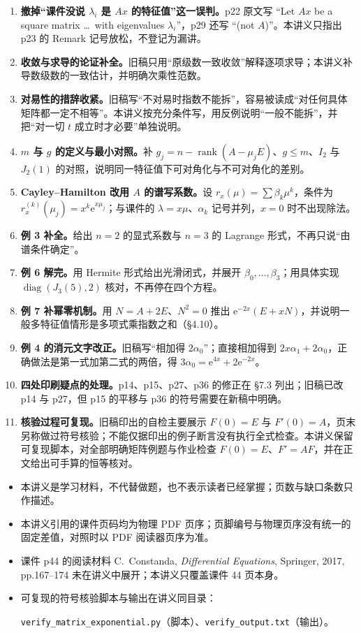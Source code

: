 \documentclass[11pt]{ctexart}
\let\basesubhdr\subhdr
\renewcommand{\subhdr}[1]{\needspace{8\baselineskip}\basesubhdr{#1}}
\DeclareMathOperator{\rank}{rank}
\DeclareMathOperator{\diag}{diag}
\newcommand{\ee}{\mathrm{e}}
\begin{document}
\begin{enumerate}
  \item \textbf{撤掉“课件没说 $\lambda_i$ 是 $Ax$ 的特征值”这一误判。}p22 原文写 “Let $Ax$ be a square matrix \dots\ with eigenvalues $\lambda_i$”，p29 还写 “(not $A$)”。本讲义只指出 p23 的 Remark 记号放松，不登记为漏讲。
  \item \textbf{收敛与求导的论证补全。}旧稿只用“原级数一致收敛”解释逐项求导；本讲义补导数级数的一致估计，并明确次乘性范数。
  \item \textbf{对易性的措辞收紧。}旧稿写“不对易时指数不能拆”，容易被读成“对任何具体矩阵都一定不相等”。本讲义按充分条件写，用反例说明“一般不能拆”，并把“对一切 $t$ 成立时才必要”单独说明。
  \item \textbf{$m$ 与 $g$ 的定义与最小对照。}补 $g_j=n-\rank(A-\mu_jE)$、$g\le m$、$I_2$ 与 $J_2(1)$ 的对照，说明同一特征值下可对角化与不可对角化的差别。
  \item \textbf{Cayley--Hamilton 改用 $A$ 的谱写系数。}设 $r_x(\mu)=\sum\beta_k\mu^k$，条件为 $r_x^{(k)}(\mu_j)=x^k\ee^{x\mu_j}$；与课件的 $\lambda=x\mu$、$\alpha_k$ 记号并列，$x=0$ 时不出现除法。
  \item \textbf{例 3 补全。}给出 $n=2$ 的显式系数与 $n=3$ 的 Lagrange 形式，不再只说“由谱条件确定”。
  \item \textbf{例 6 解完。}用 Hermite 形式给出光滑闭式，并展开 $\beta_0,\dots,\beta_3$；用具体实现 $\diag(J_3(5),2)$ 核对，不再停在四个方程。
  \item \textbf{例 7 补幂零机制。}用 $N=A+2E$、$N^2=0$ 推出 $\ee^{-2x}(E+xN)$，并说明一般多特征值情形是多项式乘指数之和（§4.10）。
  \item \textbf{例 4 的消元文字改正。}旧稿写“相加得 $2\alpha_0$”；直接相加得到 $2x\alpha_1+2\alpha_0$，正确做法是第一式加第二式的两倍，得 $3\alpha_0=\ee^{4x}+2\ee^{-2x}$。
  \item \textbf{四处印刷疑点的处理。}p14、p15、p27、p36 的修正在 §7.3 列出；旧稿已改 p14 与 p27，但 p15 的平移与 p36 的符号需要在新稿中明确。
  \item \textbf{核验过程可复现。}旧稿印出的自检主要展示 $F(0)=E$ 与 $F'(0)=A$，页末另称做过符号核验；不能仅据印出的例子断言没有执行全式检查。本讲义保留可复现脚本，对全部明确矩阵例题与作业检查 $F(0)=E$、$F'=AF$，并在正文给出可手算的恒等核对。
\end{enumerate}


\begin{itemize}
  \item 本讲义是学习材料，不代替做题，也不表示读者已经掌握；页数与缺口条数只作描述。
  \item 本讲义引用的课件页码均为物理 PDF 页序；页脚编号与物理页序没有统一的固定差值，对照时以 PDF 阅读器页序为准。
  \item 课件 p44 的阅读材料 C.~Constanda, \emph{Differential Equations}, Springer, 2017, pp.167--174 未在讲义中展开；本讲义只覆盖课件 44 页本身。
  \item 可复现的符号核验脚本与输出在讲义同目录：
  \par\noindent\texttt{verify\_matrix\_exponential.py}（脚本）、\texttt{verify\_output.txt}（输出）。
\end{itemize}
\end{document}
